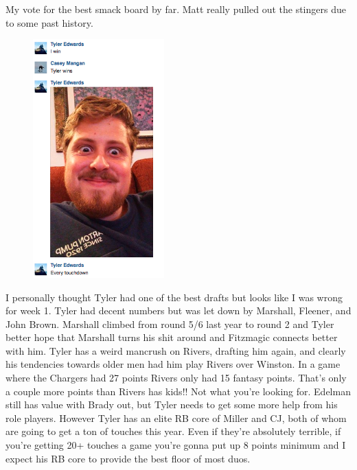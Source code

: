 \documentclass[11pt,letterpaper]{article}
\begin{document}
\newpage
{}
\bigskip\par\noindent My vote for the best smack board by far. Matt really pulled out the stingers due to some past history. 
\begin{figure}
\centering
\includegraphics[width=0.45\textwidth]{week1-tyler.png}
\label{fig:week1-tyler}
\end{figure} \par\noindent I personally thought Tyler had one of the best drafts but looks like I was wrong for week 1. Tyler had decent numbers but was let down by Marshall, Fleener, and John Brown. Marshall climbed from round 5/6 last year to round 2 and Tyler better hope that Marshall turns his shit around and Fitzmagic connects better with him. Tyler has a weird mancrush on Rivers, drafting him again, and clearly his tendencies towards older men had him play Rivers over Winston. In a game where the Chargers had 27 points Rivers only had 15 fantasy points. That's only a couple more points than Rivers has kids!! Not what you're looking for. Edelman still has value with Brady out, but Tyler needs to get some more help from his role players. However Tyler has an elite RB core of Miller and CJ, both of whom are going to get a ton of touches this year. Even if they're absolutely terrible, if you're getting 20+ touches a game you're gonna put up 8 points minimum and I expect his RB core to provide the best floor of most duos.
\end{document}

